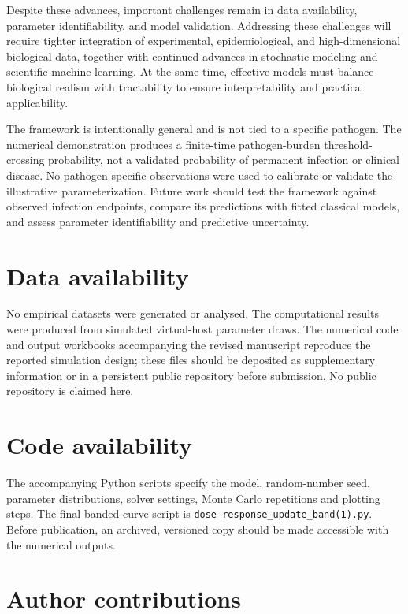 \documentclass[11pt]{article}
\begin{document}
Despite these advances, important challenges remain in data availability, parameter identifiability, and model validation. Addressing these challenges will require tighter integration of experimental, epidemiological, and high-dimensional biological data, together with continued advances in stochastic modeling and scientific machine learning. At the same time, effective models must balance biological realism with tractability to ensure interpretability and practical applicability.

The framework is intentionally general and is not tied to a specific pathogen. The numerical demonstration produces a finite-time pathogen-burden threshold-crossing probability, not a validated probability of permanent infection or clinical disease. No pathogen-specific observations were used to calibrate or validate the illustrative parameterization. Future work should test the framework against observed infection endpoints, compare its predictions with fitted classical models, and assess parameter identifiability and predictive uncertainty.



\section*{Data availability}
No empirical datasets were generated or analysed. The computational results were produced from simulated virtual-host parameter draws. The numerical code and output workbooks accompanying the revised manuscript reproduce the reported simulation design; these files should be deposited as supplementary information or in a persistent public repository before submission. No public repository is claimed here.

\section*{Code availability}
The accompanying Python scripts specify the model, random-number seed, parameter distributions, solver settings, Monte Carlo repetitions and plotting steps. The final banded-curve script is \texttt{dose-response\_update\_band(1).py}. Before publication, an archived, versioned copy should be made accessible with the numerical outputs.

\section*{Author contributions}
\end{document}
